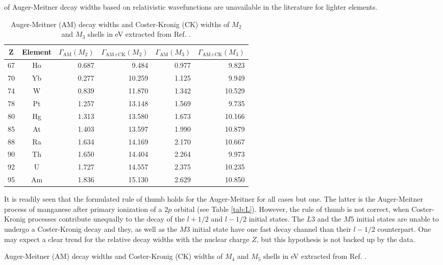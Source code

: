 \documentclass[aps,amssymb,preprint,a4paper,longbibliography]{revtex4}
\begin{document}
{of Auger-Meitner decay widths based on relativistic wavefunctions are unavailable
in the literature for lighter elements.\\
%
\begin{table*}[h]
 \caption{Auger-Meitner (AM) decay widths and Coster-Kronig (CK) widths
          of $M_2$ and $M_3$ shells in \unit{eV} extracted from
          Ref. \cite{Chen83}.}
 \begin{tabular}{ccrrrr}
 \toprule
 Z & Element & $\Gamma_\text{AM}(M_2)$ & $\Gamma_\text{AM+CK}(M_2)$ & $\Gamma_\text{AM}(M_3)$ & $\Gamma_\text{AM+CK}(M_3)$ \\
 \midrule
 67 & Ho &  0.687 &  9.484 & 0.977 &  9.823\\
 70 & Yb &  0.277 & 10.259 & 1.125 &  9.949 \\
 74 & W  &  0.839 & 11.870 & 1.342 & 10.529 \\
 78 & Pt &  1.257 & 13.148 & 1.569 &  9.735 \\
 80 & Hg &  1.313 & 13.580 & 1.673 & 10.166 \\
 85 & At &  1.403 & 13.597 & 1.990 & 10.879 \\
 88 & Ra &  1.634 & 14.169 & 2.170 & 10.667 \\
 90 & Th &  1.650 & 14.404 & 2.264 &  9.973 \\
 92 & U  &  1.727 & 14.557 & 2.375 & 10.235 \\
 95 & Am &  1.836 & 15.130 & 2.629 & 10.850 \\
 \bottomrule
 \end{tabular}
 \label{tab:M}
\end{table*}
It is readily seen that the formulated rule of thumb holds for the Auger-Meitner
for all cases but one. The latter is the Auger-Meitner process of manganese after
primary ionization of a $2p$ orbital (see Table \ref{tab:L}).
However, the rule of thumb is not correct, when Coster-Kronig processes contribute
unequally to the decay of the $l+1/2$ and $l-1/2$ initial states.
The $L3$ and the $M5$ initial states are unable to undergo a Coster-Kronig decay
and they, as well as the $M3$ initial state have one fast decay channel than their
$l-1/2$ counterpart.
One may expect a clear trend for the relative decay widths with the nuclear charge
$Z$, but this hypothesis is not backed up by the data.
%
\begin{table*}[ht]
 \caption{Auger-Meitner (AM) decay widths and Coster-Kronig (CK) widths
          of $M_4$ and $M_5$ shells
          in \unit{eV} extracted from
          Ref. \cite{Chen80}.}

\end{table*}}
\end{document}
